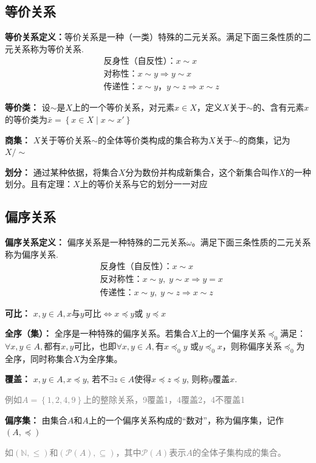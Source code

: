\documentclass[zihao=-4,UTF8]{report}
\begin{document}
\subsection{等价关系}
\textbf{等价关系定义：}等价关系是一种（一类）特殊的二元关系。满足下面三条性质的二元关系称为等价关系.
\begin{align*}
    &\text{反身性（自反性）：}x\sim x\\
    &\text{对称性：}x\sim y \Longrightarrow y\sim x\\
    &\text{传递性：}x\sim y\text{，}y\sim z \Longrightarrow x\sim z
\end{align*}

\textbf{等价类：}
设$\sim $是$X$上的一个等价关系，对元素$x \in X$，定义$X$关于$\sim $的、含有元素$x$的等价类为$\bar{x} =\left \{x\in X\mid x \sim x' \right \}$

\textbf{商集：}
$X$关于等价关系$\sim$的全体等价类构成的集合称为$X$关于$\sim$的商集，记为$X/\sim $

\textbf{划分：}
通过某种依据，将集合$X$分为数份并构成新集合，这个新集合叫作$X$的一种划分。且有定理：$X$上的等价关系与它的划分一一对应

\subsection{偏序关系}
\textbf{偏序关系定义：}
偏序关系是一种特殊的二元关系$\omega$。满足下面三条性质的二元关系称为偏序关系.
\begin{align*}
    &\text{反身性（自反性）：}x\sim x\\
    &\text{反对称性：}x\sim y,\;y\sim x \Longrightarrow y=x\\
    &\text{传递性：}x\sim y,\;y\sim z \Longrightarrow x\sim z
\end{align*}

\textbf{可比：}
$x,y\in A,x$与$y$可比$\Longleftrightarrow x\preceq y $或 $y\preceq x$

\textbf{全序（集）：}
全序是一种特殊的偏序关系。若集合$X$上的一个偏序关系$\preceq_{0}$满足：$\forall x,y\in A, $都有$x,y$可比，也即$\forall x,y\in A, $有$x\preceq_{0}y$ 或$y\preceq_{0}x$，则称偏序关系$\preceq_{0}$为全序，同时称集合$X$为全序集。

\textbf{覆盖：}
$x,y\in A ,x \preceq y $, 若不$\exists z \in A $使得$x\preceq z\preceq y$, 则称$y$覆盖$x$.\par
\textcolor{gray}{例如$A=\left \{ 1,2,4,9 \right \} $上的整除关系，9覆盖1，4覆盖2，4不覆盖1}

\textbf{偏序集：}
由集合$A$和$A$上的一个偏序关系构成的``数对''，称为偏序集，记作$(A,\preceq)$\par
\textcolor{gray}{如$(\mathbb{N}, \le )$和$(\mathcal{P}(A) , \subseteq)$，其中$\mathcal{P}(A)$表示$A$的全体子集构成的集合。}
\end{document}
